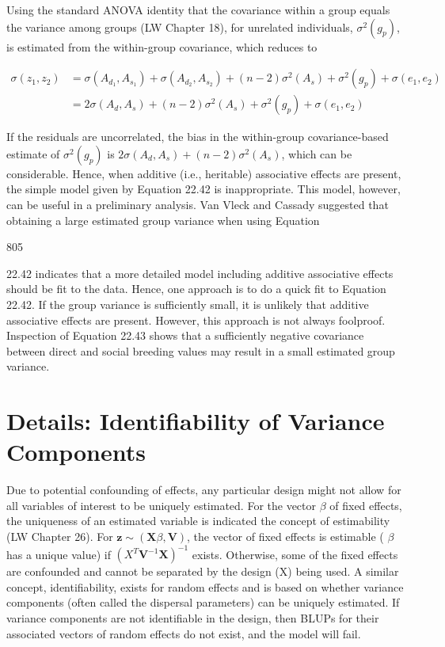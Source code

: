 \documentclass{article}
\begin{document}
Using the standard ANOVA identity that the covariance within a group equals the variance among groups (LW Chapter 18), for unrelated individuals,  $ \sigma^{2}(g_{p}) $, is estimated from the within-group covariance, which reduces to

\begin{equation}
\begin{aligned}\sigma(z_{1},z_{2})&=\sigma(A_{d_{1}},A_{s_{1}})+\sigma(A_{d_{2}},A_{s_{2}})+(n-2)\sigma^{2}(A_{s})+\sigma^{2}(g_{p})+\sigma(e_{1},e_{2})\\&=2\sigma(A_{d},A_{s})+(n-2)\sigma^{2}(A_{s})+\sigma^{2}(g_{p})+\sigma(e_{1},e_{2})\end{aligned}
\tag{22.43}
\label{eq:22_43}
\end{equation}

If the residuals are uncorrelated, the bias in the within-group covariance-based estimate of  $ \sigma^2(g_p) $ is  $ 2\sigma(A_d, A_s) + (n - 2)\sigma^2(A_s) $, which can be considerable. Hence, when additive (i.e., heritable) associative effects are present, the simple model given by Equation 22.42 is inappropriate. This model, however, can be useful in a preliminary analysis. Van Vleck and Cassady suggested that obtaining a large estimated group variance when using Equation

805

22.42 indicates that a more detailed model including additive associative effects should be fit to the data. Hence, one approach is to do a quick fit to Equation 22.42. If the group variance is sufficiently small, it is unlikely that additive associative effects are present. However, this approach is not always foolproof. Inspection of Equation 22.43 shows that a sufficiently negative covariance between direct and social breeding values may result in a small estimated group variance.

\section{Details: Identifiability of Variance Components}
Due to potential confounding of effects, any particular design might not allow for all variables of interest to be uniquely estimated. For the vector  $ \beta $ of fixed effects, the uniqueness of an estimated variable is indicated the concept of estimability (LW Chapter 26). For  $ \mathbf{z} \sim (\mathbf{X}\beta, \mathbf{V}) $, the vector of fixed effects is estimable ( $ \beta $ has a unique value) if  $ (X^T \mathbf{V}^{-1} \mathbf{X})^{-1} $ exists. Otherwise, some of the fixed effects are confounded and cannot be separated by the design (X) being used. A similar concept, identifiability, exists for random effects and is based on whether variance components (often called the dispersal parameters) can be uniquely estimated. If variance components are not identifiable in the design, then BLUPs for their associated vectors of random effects do not exist, and the model will fail.
\end{document}
